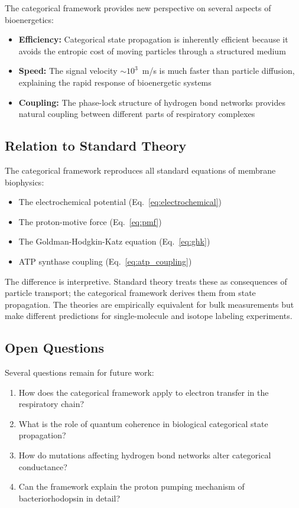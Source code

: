 \documentclass[twocolumn,showpacs,preprintnumbers,amsmath,amssymb,prd]{revtex4-2}
\begin{document}
The categorical framework provides new perspective on several aspects of bioenergetics:

\begin{itemize}
\item \textbf{Efficiency:} Categorical state propagation is inherently efficient because it avoids the entropic cost of moving particles through a structured medium

\item \textbf{Speed:} The signal velocity $\sim 10^3$~m/s is much faster than particle diffusion, explaining the rapid response of bioenergetic systems

\item \textbf{Coupling:} The phase-lock structure of hydrogen bond networks provides natural coupling between different parts of respiratory complexes
\end{itemize}

\subsection{Relation to Standard Theory}

The categorical framework reproduces all standard equations of membrane biophysics:
\begin{itemize}
\item The electrochemical potential (Eq.~\ref{eq:electrochemical})
\item The proton-motive force (Eq.~\ref{eq:pmf})
\item The Goldman-Hodgkin-Katz equation (Eq.~\ref{eq:ghk})
\item ATP synthase coupling (Eq.~\ref{eq:atp_coupling})
\end{itemize}

The difference is interpretive. Standard theory treats these as consequences of particle transport; the categorical framework derives them from state propagation. The theories are empirically equivalent for bulk measurements but make different predictions for single-molecule and isotope labeling experiments.

\subsection{Open Questions}

Several questions remain for future work:

\begin{enumerate}
\item How does the categorical framework apply to electron transfer in the respiratory chain?
\item What is the role of quantum coherence in biological categorical state propagation?
\item How do mutations affecting hydrogen bond networks alter categorical conductance?
\item Can the framework explain the proton pumping mechanism of bacteriorhodopsin in detail?
\end{enumerate}
\end{document}
